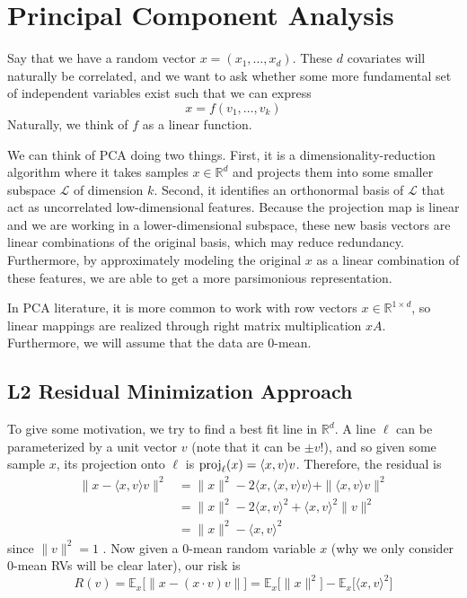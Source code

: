 \section{Principal Component Analysis}  

  Say that we have a random vector $x = (x_1, \ldots, x_d)$. These $d$ covariates will naturally be correlated, and we want to ask whether some more fundamental set of independent variables exist \cite{1933hotelling} such that we can express
  \begin{equation}
    x = f(v_1, \ldots, v_k)
  \end{equation} 
  Naturally, we think of $f$ as a linear function. 

  We can think of PCA doing two things. First, it is a dimensionality-reduction algorithm where it takes samples $x \in \mathbb{R}^d$ and projects them into some smaller subspace $\mathcal{L}$ of dimension $k$. Second, it identifies an orthonormal basis of $\mathcal{L}$ that act as uncorrelated low-dimensional features. Because the projection map is linear and we are working in a lower-dimensional subspace, these new basis vectors are linear combinations of the original basis, which may reduce redundancy. Furthermore, by approximately modeling the original $x$ as a linear combination of these features, we are able to get a more parsimonious representation. 

  In PCA literature, it is more common to work with row vectors $x \in \mathbb{R}^{1 \times d}$, so linear mappings are realized through right matrix multiplication $x A$. Furthermore, we will assume that the data are $0$-mean. 

\subsection{L2 Residual Minimization Approach} 

  To give some motivation, we try to find a best fit line in $\mathbb{R}^d$. A line $\ell$ can be parameterized by a unit vector $v$ (note that it can be $\pm v$!), and so given some sample $x$, its projection onto $\ell$ is $\operatorname{proj}_{\ell} (x) = \langle x, v\rangle v$. Therefore, the residual is 
  \begin{align}
    \| x - \langle x, v \rangle v \|^2 & = \|x\|^2 - 2 \langle x, \langle x, v \rangle v \rangle + \| \langle x, v \rangle v \|^2 \\ 
                                       & = \|x\|^2 - 2 \langle x, v \rangle^2 + \langle x, v \rangle^2 \|v\|^2 \\ 
                                       & = \|x\|^2 - \langle x, v \rangle^2
  \end{align}
  since $\|v\|^2 = 1$ \cite{2019shalizi}. Now given a $0$-mean random variable $x$ (why we only consider $0$-mean RVs will be clear later), our risk is
  \begin{equation}
    R(v) = \mathbb{E}_x \big[ \| x - (x \cdot v) v \| \big] = \mathbb{E}_x \big[ \|x\|^2 \big] - \mathbb{E}_x \big[ \langle x, v \rangle^2 \big]
  \end{equation} 

